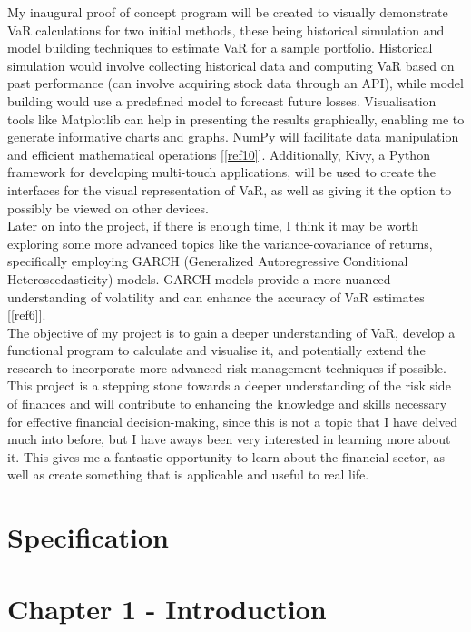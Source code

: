\documentclass{article}
\begin{document}
My inaugural proof of concept program will be created to visually demonstrate VaR calculations for  two initial methods, these being historical simulation and model building techniques to estimate VaR for a sample portfolio. Historical simulation would involve collecting historical data and computing VaR based on past performance (can involve acquiring stock data through an API), while model building would use a predefined model to forecast future losses. Visualisation tools like Matplotlib can help in presenting the results graphically, enabling me to generate informative charts and graphs. NumPy will facilitate data manipulation and efficient mathematical operations [\ref{ref10}]. Additionally, Kivy, a Python framework for developing multi-touch applications, will be used to create the interfaces for the visual representation of VaR, as well as giving it the option to possibly be viewed on other devices. \\

Later on into the project, if there is enough time, I think it may be worth exploring some more advanced topics like the variance-covariance of returns, specifically employing GARCH (Generalized Autoregressive Conditional Heteroscedasticity) models. GARCH models provide a more nuanced understanding of volatility and can enhance the accuracy of VaR estimates [\ref{ref6}]. \\

The objective of my project is to gain a deeper understanding of VaR, develop a functional program to calculate and visualise it, and potentially extend the research to incorporate more advanced risk management techniques if possible. This project is a stepping stone towards a deeper understanding of the risk side of finances and will contribute to enhancing the knowledge and skills necessary for effective financial decision-making, since this is not a topic that I have delved much into before, but I have aways been very interested in learning more about it. This gives me a fantastic opportunity to learn about the financial sector, as well as create something that is applicable and useful to real life. \\


\section{Specification}


\section{Chapter 1 - Introduction}
\end{document}
